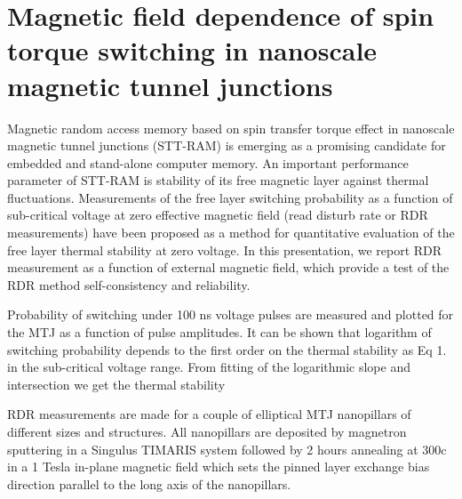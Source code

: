 \chapter{Magnetic field dependence of spin torque switching in nanoscale magnetic tunnel junctions }



Magnetic random access memory based on spin transfer torque effect in nanoscale magnetic tunnel junctions (STT-RAM) is emerging as a promising candidate for embedded and stand-alone computer memory. An important performance parameter of STT-RAM is stability of its free magnetic layer against thermal fluctuations. Measurements of the free layer switching probability as a function of sub-critical voltage at zero effective magnetic field (read disturb rate or RDR measurements) have been proposed as a method for quantitative evaluation of the free layer thermal stability at zero voltage. In this presentation, we report RDR measurement as a function of external magnetic field, which provide a test of the RDR method self-consistency and reliability. 

Probability of switching under 100 ns voltage pulses are measured and plotted for the MTJ as a function of pulse amplitudes. It can be shown that logarithm of switching probability depends to the first order on the thermal stability  as Eq 1. in the sub-critical voltage range. From fitting of the logarithmic slope and intersection we get the thermal stability 



RDR measurements are made for a couple of elliptical MTJ nanopillars of different sizes and structures. All nanopillars are deposited by magnetron sputtering in a Singulus TIMARIS system followed by 2 hours annealing at 300c in a 1 Tesla in-plane magnetic field which sets the pinned layer exchange bias direction parallel to the long axis of the nanopillars.









